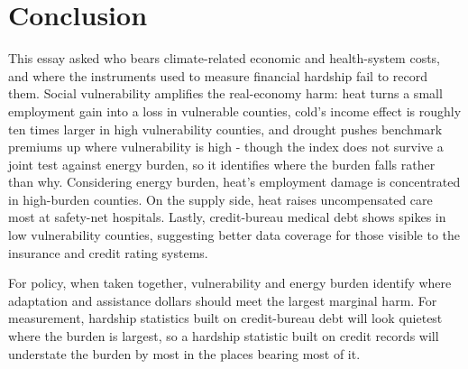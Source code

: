 \documentclass[a4paper,11pt]{report}
\begin{document}
\FloatBarrier
\section{Conclusion}

This essay asked who bears climate-related economic and health-system costs, and where the instruments used to measure financial hardship fail to record them. Social vulnerability amplifies the real-economy harm: heat turns a small employment gain into a loss in vulnerable counties, cold's income effect is roughly ten times larger in high vulnerability counties, and drought pushes benchmark premiums up where vulnerability is high - though the index does not survive a joint test against energy burden, so it identifies where the burden falls rather than why. Considering energy burden, heat's employment damage is concentrated in high-burden counties. On the supply side, heat raises uncompensated care most at safety-net hospitals. Lastly, credit-bureau medical debt shows spikes in low vulnerability counties, suggesting better data coverage for those visible to the insurance and credit rating systems.

For policy, when taken together, vulnerability and energy burden identify where adaptation and assistance dollars should meet the largest marginal harm. For measurement, hardship statistics built on credit-bureau debt will look quietest where the burden is largest, so a hardship statistic built on credit records will understate the burden by most in the places bearing most of it.

\FloatBarrier
\clearpage


\end{document}
